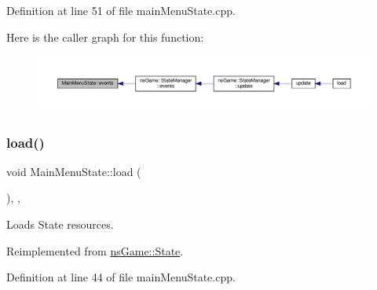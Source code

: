 Definition at line 51 of file main\+Menu\+State.\+cpp.

Here is the caller graph for this function\+:\nopagebreak
\begin{figure}[H]
\begin{center}
\leavevmode
\includegraphics[width=350pt]{class_main_menu_state_a6d740479d4dce733c069921478d70a37_icgraph}
\end{center}
\end{figure}
\mbox{\label{class_main_menu_state_a723f41a3c34138c5c5f7dcafc076718e}} 
\subsubsection{\texorpdfstring{load()}{load()}}
{\footnotesize\ttfamily void Main\+Menu\+State\+::load (\begin{DoxyParamCaption}{ }\end{DoxyParamCaption})\hspace{0.3cm}{\ttfamily [inline]}, {\ttfamily [override]}, {\ttfamily [virtual]}}



Loads State resources. 



Reimplemented from \hyperlink{structns_game_1_1_state_a8644de505f7a84933f6d6e6651205791}{ns\+Game\+::\+State}.



Definition at line 44 of file main\+Menu\+State.\+cpp.


